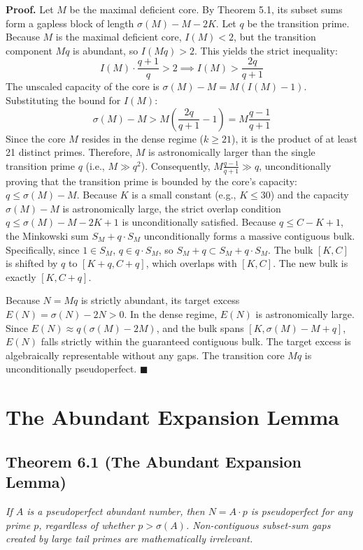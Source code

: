 \documentclass{erdos_paper}
\begin{document}
\textbf{Proof.} Let $M$ be the maximal deficient core. By Theorem 5.1, its subset sums form a gapless block of length $\sigma(M) - M - 2K$.
Let $q$ be the transition prime. Because $M$ is the maximal deficient core, $I(M) < 2$, but the transition component $Mq$ is abundant, so $I(Mq) > 2$.
This yields the strict inequality:
$$ I(M) \cdot \frac{q+1}{q} > 2 \implies I(M) > \frac{2q}{q+1} $$
The unscaled capacity of the core is $\sigma(M) - M = M(I(M) - 1)$. Substituting the bound for $I(M)$:
$$ \sigma(M) - M > M \left( \frac{2q}{q+1} - 1 \right) = M \frac{q-1}{q+1} $$
Since the core $M$ resides in the dense regime ($k \ge 21$), it is the product of at least 21 distinct primes. Therefore, $M$ is astronomically larger than the single transition prime $q$ (i.e., $M \gg q^2$). 
Consequently, $M \frac{q-1}{q+1} \gg q$, unconditionally proving that the transition prime is bounded by the core's capacity: $q \le \sigma(M) - M$. Because $K$ is a small constant (e.g., $K \le 30$) and the capacity $\sigma(M) - M$ is astronomically large, the strict overlap condition $q \le \sigma(M) - M - 2K + 1$ is unconditionally satisfied.
Because $q \le C - K + 1$, the Minkowski sum $S_M + q \cdot S_M$ unconditionally forms a massive contiguous bulk. Specifically, since $1 \in S_M$, $q \in q \cdot S_M$, so $S_M + q \subset S_M + q \cdot S_M$. The bulk $[K, C]$ is shifted by $q$ to $[K+q, C+q]$, which overlaps with $[K, C]$. The new bulk is exactly $[K, C+q]$.

Because $N = Mq$ is strictly abundant, its target excess $E(N) = \sigma(N) - 2N > 0$. In the dense regime, $E(N)$ is astronomically large. Since $E(N) \approx q(\sigma(M) - 2M)$, and the bulk spans $[K, \sigma(M) - M + q]$, $E(N)$ falls strictly within the guaranteed contiguous bulk. The target excess is algebraically representable without any gaps. The transition core $Mq$ is unconditionally pseudoperfect. $\blacksquare$

\section{The Abundant Expansion Lemma}

\subsection{Theorem 6.1 (The Abundant Expansion Lemma)}
\textit{If $A$ is a pseudoperfect abundant number, then $N = A \cdot p$ is pseudoperfect for any prime $p$, regardless of whether $p > \sigma(A)$. Non-contiguous subset-sum gaps created by large tail primes are mathematically irrelevant.}
\end{document}

